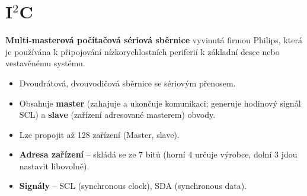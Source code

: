 \section{I$^2$C}
\textbf{Multi-masterová počítačová sériová sběrnice} vyvinutá firmou Philips, která je používána k připojování nízkorychlostních periferií k základní desce nebo vestavěnému systému.
\begin{itemize}
    \item Dvoudrátová, dvouvodičová sběrnice se sériovým přenosem.
    \item Obsahuje \textbf{master} (zahajuje a ukončuje komunikaci; generuje hodinový signál SCL) a \textbf{slave} (zařízení adresované masterem) obvody.
    \item Lze propojit až 128 zařízení (Master, slave).
    \item \textbf{Adresa zařízení} -- skládá se ze 7 bitů (horní 4 určuje výrobce, dolní 3 jdou nastavit libovolně).
    \item \textbf{Signály} -- SCL (synchronous clock), SDA (synchronous data).
\end{itemize}
